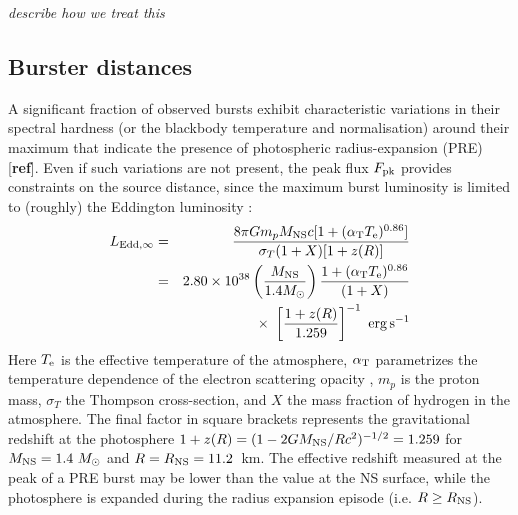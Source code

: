 \documentclass{aastex63}
\newcommand{\eps}{{\rm erg\,s^{-1}}}
\newcommand{\opz}{1.259}
\begin{document}
{\it describe how we treat this }

\subsection{Burster distances}
\label{subsec:distance}

A significant fraction of observed bursts exhibit characteristic variations in their spectral hardness (or the blackbody temperature and normalisation) around their maximum that indicate the presence of photospheric radius-expansion (PRE) [{\bf ref}]. 
%
Even if such variations are not present, 
%
the peak flux $F_{\rm pk}$ provides constraints on the source distance, since the maximum burst luminosity is limited to (roughly) the Eddington luminosity \cite[e.g.][]{lew93}:
\begin{eqnarray}
  L_{\rm Edd,\infty} & = & \frac{8\pi G m_p M_{\rm NS} c
  [1+(\alpha_{\rm T}T_{\rm e})^{0.86}]} {\sigma_T(1+X)[1+z(R)]} %
       \nonumber \\
  & = & 2.80\times10^{38} \left(\frac{M_{\rm NS}}{1.4M_\odot}\right)
 \frac{1+(\alpha_{\rm T}T_{\rm e})^{0.86}}{(1+X)}
\nonumber \\ & & \times\  %
    \left[\frac{1+z(R)}{\opz}\right]^{-1}\ %
              \eps
  \label{ledd}
\end{eqnarray}
Here
$T_{\rm e}$ is the
effective temperature of the atmosphere, $\alpha_{\rm T}$ parametrizes the temperature dependence of the electron scattering
opacity \cite[$\simeq 2.2\times10^{-9}$~K$^{-1}$;][]{lew93},
$m_p$ is the proton mass, $\sigma_T$ the Thompson 
cross-section, and $X$ the
mass fraction of hydrogen in the atmosphere.
The final factor in
square brackets represents the gravitational redshift 
at the photosphere $1+z(R)=(1-2GM_{\rm NS}/R
c^2)^{-1/2}=1.259$ for $M_{\rm NS}=1.4\ M_\odot$ and $R=R_{\rm NS}=11.2$~km.
%
The effective redshift measured at the peak of a PRE burst may be lower than the value at the NS surface, while the photosphere is expanded during the radius expansion episode (i.e. $R\ge R_{\rm NS}$).

\end{document}
